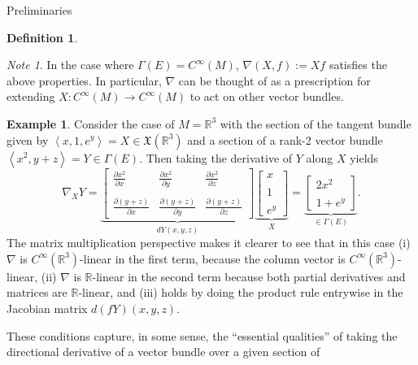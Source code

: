 \documentclass{article}
\newcommand{\fn}[3]{#1 \colon #2 \rightarrow #3}
\newcommand{\ang}[1]{\left\langle#1\right\rangle}
\newcommand{\pd}[2]{\frac{\partial #1}{\partial #2}}
\theoremstyle{definition}
\newtheorem{definition}{Definition}[section]
\newtheorem{example}{Example}[section]
\theoremstyle{remark}
\newtheorem{remark}{Note}[section]
\begin{document}
\begin{section}{Preliminaries}
\begin{definition}
  \end{definition}
  \begin{remark} %
    In the case where $\Gamma(E) = C^\infty(M)$, $\nabla(X, f) := Xf$ satisfies
    the above properties. In particular, $\nabla$ can be thought of as a
    prescription for extending $\fn X {C^\infty(M)}{C^\infty(M)}$ to act on other
    vector bundles.
  \end{remark}
  \begin{example}
    Consider the case of $M = \mathbb R^3$ with the section of the tangent
    bundle given by  $\ang{x, 1, e^y} = X \in \mathfrak X(\mathbb R^3)$
    and a section of a rank-2 vector bundle $\ang{x^2, y + z} = Y \in \Gamma(E)$. Then taking
    the derivative of $Y$ along $X$ yields \[
      \nabla_XY = \underbrace{\begin{bmatrix}
        \displaystyle\pd{x^2}{x} & \displaystyle\pd{x^2}{y} & \displaystyle\pd{x^2}{z} \\
        \\
        \displaystyle\pd{(y+z)}{x} & \displaystyle\pd{(y + z)}{y} & \displaystyle\pd{(y + z)}{z}
      \end{bmatrix}}_{dY(x,y,z)}
      \underbrace{\begin{bmatrix}
        x \\~\\ 1 \\~\\ e^y
      \end{bmatrix}}_{X} =
      \underbrace{
        \begin{bmatrix}
          2x^2 \\~\\ 1 + e^y
        \end{bmatrix}
      }_{\in \Gamma(E)}.
    \] The matrix multiplication perspective makes it clearer to see that in
    this case (i) $\nabla$ is $C^\infty(\mathbb R^3)$-linear in the first
    term, because the column vector is $C^\infty(\mathbb R^3)$-linear,
    (ii) $\nabla$ is $\mathbb R$-linear in the second term because both partial
    derivatives and matrices are $\mathbb R$-linear, and (iii) holds by doing
    the product rule entrywise in the Jacobian matrix $d(fY)(x,y,z)$.
  \end{example}
  These conditions capture, in some sense, the ``essential qualities'' of
  taking the directional derivative of a vector bundle over a given section of

\end{section}
\end{document}
